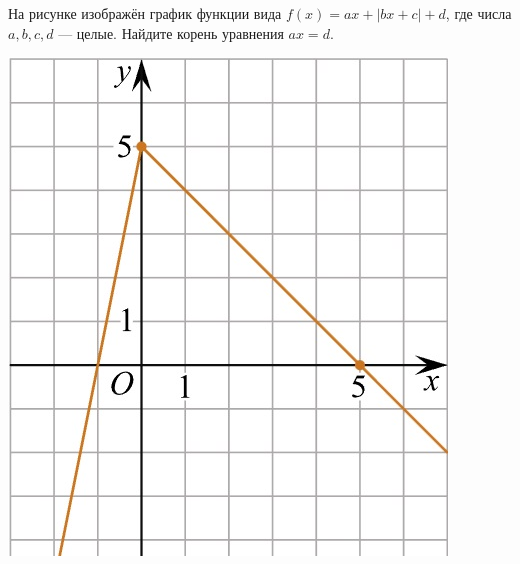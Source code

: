 \begin{class}[number=5]
\begin{listofex}
		\newpage
		\item
		\begin{minipage}[t]{0.43\textwidth}
			На рисунке изображён график функции вида \(f(x)=ax+|bx+c|+d\), где числа \(a, b, c, d\) --- целые. Найдите корень уравнения \(ax=d\).
		\end{minipage}
		\begin{minipage}[c]{0.27\textwidth}
			\includegraphics[align=t, width=\textwidth]{pics/G101M4C5-10.jpg}
		\end{minipage}
	\end{listofex}
\end{class}
\newpage
%
%
%	
%
%

